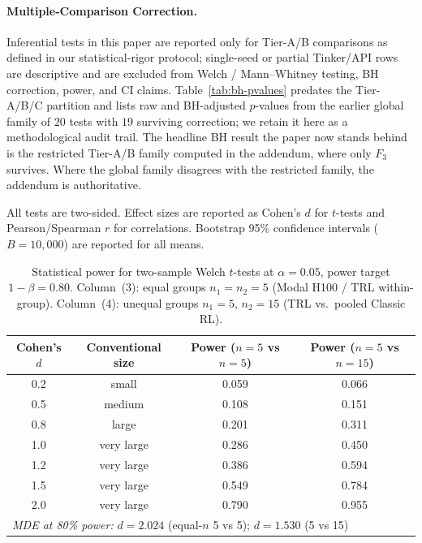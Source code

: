 \documentclass{article}  \usepackage[preprint,nonatbib]{neurips_2026} \usepackage[numbers]{natbib}
\begin{document}
\paragraph{Multiple-Comparison Correction.}
Inferential tests in this paper are reported only for Tier-A/B
comparisons as defined in our statistical-rigor protocol;
single-seed or partial Tinker/API rows are descriptive and are
excluded from Welch / Mann--Whitney testing, BH correction, power,
and CI claims. Table~\ref{tab:bh-pvalues} predates the Tier-A/B/C
partition and lists raw and BH-adjusted $p$-values from the
earlier global family of $20$ tests with $19$ surviving correction;
we retain it here as a methodological audit trail. The headline
BH result the paper now stands behind is the restricted Tier-A/B
family computed in the addendum, where only $F_3$ survives. Where
the global family disagrees with the restricted family, the
addendum is authoritative.

All tests are two-sided.  Effect sizes are reported as Cohen's $d$ for
$t$-tests and Pearson/Spearman $r$ for correlations.  Bootstrap 95\%
confidence intervals ($B = 10{,}000$) are reported for all means.

\begin{table}[!ht]
\centering
\caption{Statistical power for two-sample Welch $t$-tests at $\alpha = 0.05$,
         power target $1{-}\beta = 0.80$.
         Column~(3): equal groups $n_1 = n_2 = 5$ (Modal H100 / TRL within-group).
         Column~(4): unequal groups $n_1 = 5$, $n_2 = 15$ (TRL vs.\ pooled Classic RL).}
\label{tab:power-analysis}
\small
\begin{tabular}{@{}cccc@{}}
\toprule
Cohen's $d$ & Conventional size & Power ($n{=}5$ vs $n{=}5$) & Power ($n{=}5$ vs $n{=}15$) \\
\midrule
        0.2 & small & 0.059 & 0.066 \\
        0.5 & medium & 0.108 & 0.151 \\
        0.8 & large & 0.201 & 0.311 \\
        1.0 & very large & 0.286 & 0.450 \\
        1.2 & very large & 0.386 & 0.594 \\
        1.5 & very large & 0.549 & 0.784 \\
        2.0 & very large & 0.790 & 0.955 \\
\midrule
\multicolumn{4}{l}{\textit{MDE at 80\% power:} $d = 2.024$ (equal-$n$ 5 vs 5);\; $d = 1.530$ (5 vs 15)} \\
\bottomrule
\end{tabular}
\end{table}
\end{document}
